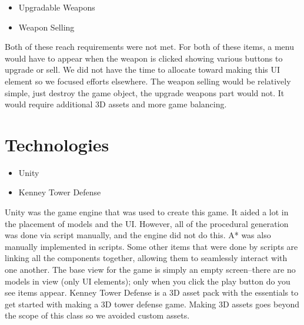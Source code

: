 \documentclass{article}
\begin{document}
\begin{itemize}
    \item Upgradable Weapons
    \item Weapon Selling
\end{itemize}

Both of these reach requirements were not met. For both of these items, a menu would have to appear when the weapon is clicked showing various buttons to upgrade or sell. We did not have the time to allocate toward making this UI element so we focused efforts elsewhere. The weapon selling would be relatively simple, just destroy the game object, the upgrade weapons part would not. It would require additional 3D assets and more game balancing.

\section{Technologies}
\label{sec:Technologies}

\begin{itemize}
    \item Unity
    \item Kenney Tower Defense
\end{itemize}

Unity was the game engine that was used to create this game. It aided a lot in the placement of models and the UI. However, all of the procedural generation was done via script manually, and the engine did not do this. A* was also manually implemented in scripts. Some other items that were done by scripts are linking all the components together, allowing them to seamlessly interact with one another. The base view for the game is simply an empty screen--there are no models in view (only UI elements); only when you click the play button do you see items appear. Kenney Tower Defense is a 3D asset pack with the essentials to get started with making a 3D tower defense game. Making 3D assets goes beyond the scope of this class so we avoided custom assets.
\end{document}
